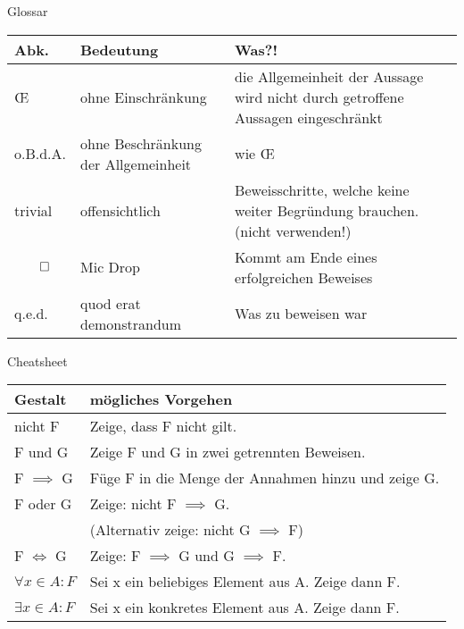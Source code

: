 \begin{frame}[fragile]{Glossar}
	\small
	\begin{tabular}{p{} p{} p{}}
		\toprule
		Abk.&Bedeutung&Was?!\\
		\midrule
		\OE & ohne Einschränkung & die Allgemeinheit der Aussage wird nicht durch getroffene Aussagen eingeschränkt\\
		o.B.d.A. & ohne Beschränkung der Allgemeinheit & wie \OE\\
		trivial&offensichtlich&Beweisschritte, welche keine weiter Begründung brauchen. (nicht verwenden!)\\
		$\qed$&Mic Drop&Kommt am Ende eines erfolgreichen Beweises\\
		q.e.d.&quod erat demonstrandum&Was zu beweisen war\\
		\bottomrule
	\end{tabular}
\end{frame}

\begin{frame}[fragile]{Cheatsheet}
	\small
	\begin{tabular}{p{} p{}}
		\toprule
		Gestalt&mögliches Vorgehen\\
		\midrule
		nicht F&Zeige, dass F nicht gilt.\\
		F und G&Zeige F und G in zwei getrennten Beweisen.\\
		F $\implies$ G&Füge F in die Menge der Annahmen hinzu und zeige G.\\
		F oder G&Zeige: nicht F $\implies$ G. \\&(Alternativ zeige: nicht G $\implies$ F)\\
		F $\iff$ G&Zeige: F $\implies$ G und G $\implies$ F.\\
		$\forall x \in A : F$&Sei x ein beliebiges Element aus A. Zeige dann F.\\
		$\exists x \in A : F$&Sei x ein konkretes Element aus A. Zeige dann F.\\
		\bottomrule
	\end{tabular}
\end{frame}